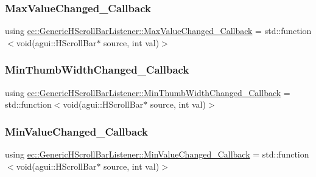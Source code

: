 \subsubsection{\texorpdfstring{Max\+Value\+Changed\+\_\+\+Callback}{MaxValueChanged\_Callback}}
{\footnotesize\ttfamily using \mbox{\hyperlink{classec_1_1_generic_h_scroll_bar_listener_a477535313b5feb1040874b1c0c9c9d1f}{ec\+::\+Generic\+H\+Scroll\+Bar\+Listener\+::\+Max\+Value\+Changed\+\_\+\+Callback}} =  std\+::function$<$void(agui\+::\+H\+Scroll\+Bar$\ast$ source, int val)$>$}

\mbox{\label{classec_1_1_generic_h_scroll_bar_listener_a3bfa95b52b5ce492d638cef95b830227}} 
\subsubsection{\texorpdfstring{Min\+Thumb\+Width\+Changed\+\_\+\+Callback}{MinThumbWidthChanged\_Callback}}
{\footnotesize\ttfamily using \mbox{\hyperlink{classec_1_1_generic_h_scroll_bar_listener_a3bfa95b52b5ce492d638cef95b830227}{ec\+::\+Generic\+H\+Scroll\+Bar\+Listener\+::\+Min\+Thumb\+Width\+Changed\+\_\+\+Callback}} =  std\+::function$<$void(agui\+::\+H\+Scroll\+Bar$\ast$ source, int val)$>$}

\mbox{\label{classec_1_1_generic_h_scroll_bar_listener_a0e75a452c9f937fb1539bdb395fb62a5}} 
\subsubsection{\texorpdfstring{Min\+Value\+Changed\+\_\+\+Callback}{MinValueChanged\_Callback}}
{\footnotesize\ttfamily using \mbox{\hyperlink{classec_1_1_generic_h_scroll_bar_listener_a0e75a452c9f937fb1539bdb395fb62a5}{ec\+::\+Generic\+H\+Scroll\+Bar\+Listener\+::\+Min\+Value\+Changed\+\_\+\+Callback}} =  std\+::function$<$void(agui\+::\+H\+Scroll\+Bar$\ast$ source, int val)$>$}

